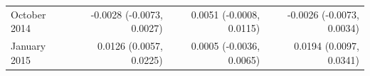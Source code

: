 \begin{tabular}{lrrr}
October 2014 & -0.0028 (-0.0073, 0.0027) & 0.0051 (-0.0008, 0.0115) & -0.0026 (-0.0073, 0.0034) \\
January 2015 & 0.0126 (0.0057, 0.0225) & 0.0005 (-0.0036, 0.0065) & 0.0194 (0.0097, 0.0341) \\

\end{tabular}
